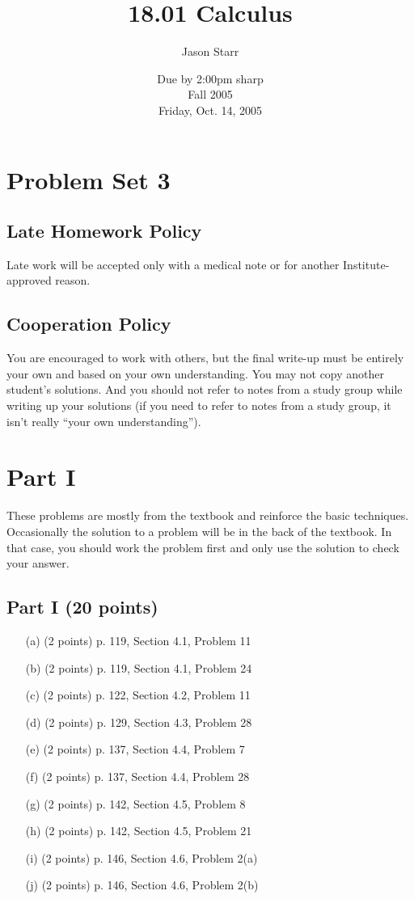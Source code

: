 \documentclass[12pt]{article}
\title{18.01 Calculus}
\author{Jason Starr}
\date{Due by 2:00pm sharp \\ Fall 2005 \\ Friday, Oct. 14, 2005}
\begin{document}
\maketitle

\section*{Problem Set 3}

\subsection*{Late Homework Policy}
Late work will be accepted only with a medical note or for another Institute-approved reason.

\subsection*{Cooperation Policy}
You are encouraged to work with others, but the final write-up must be entirely your own and based on your own understanding. You may not copy another student’s solutions. And you should not refer to notes from a study group while writing up your solutions (if you need to refer to notes from a study group, it isn’t really “your own understanding”). 

\section*{Part I}
These problems are mostly from the textbook and reinforce the basic techniques. Occasionally the solution to a problem will be in the back of the textbook. In that case, you should work the problem first and only use the solution to check your answer. 

\subsection*{Part I (20 points)}
\begin{enumerate}
    \item[(a)] (2 points) p. 119, Section 4.1, Problem 11 
    \item[(b)] (2 points) p. 119, Section 4.1, Problem 24 
    \item[(c)] (2 points) p. 122, Section 4.2, Problem 11 
    \item[(d)] (2 points) p. 129, Section 4.3, Problem 28 
    \item[(e)] (2 points) p. 137, Section 4.4, Problem 7 
    \item[(f)] (2 points) p. 137, Section 4.4, Problem 28 
    \item[(g)] (2 points) p. 142, Section 4.5, Problem 8 
    \item[(h)] (2 points) p. 142, Section 4.5, Problem 21 
    \item[(i)] (2 points) p. 146, Section 4.6, Problem 2(a) 
    \item[(j)] (2 points) p. 146, Section 4.6, Problem 2(b) 
\end{enumerate}
\end{document}
